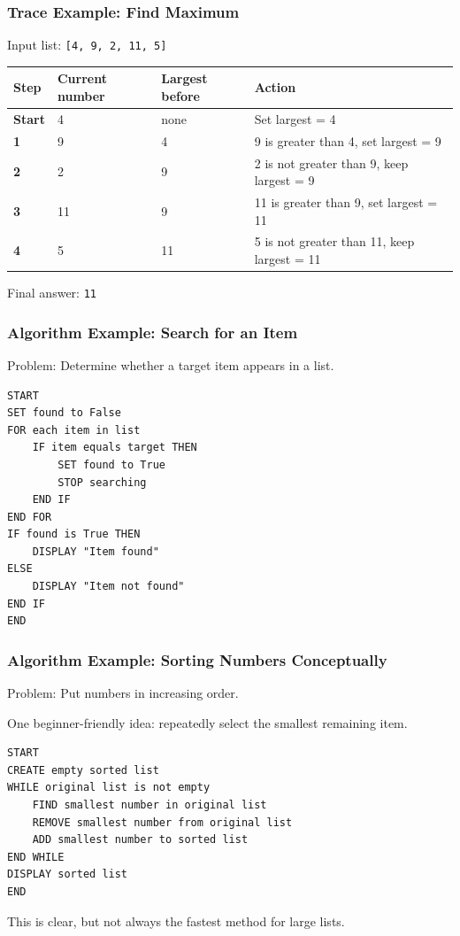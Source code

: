 \documentclass[aspectratio=169,10pt]{beamer}
\begin{document}
\begin{frame}
\frametitle{Trace Example: Find Maximum}
\vspace{0.72cm}
Input list: \texttt{[4, 9, 2, 11, 5]}
\vspace{0.05cm}
\renewcommand{\arraystretch}{1.1}
\begin{tabularx}{\textwidth}{>{\bfseries}p{1.75cm}p{2.25cm}p{2.55cm}X}
\toprule
Step & Current number & Largest before & Action \\
\midrule
Start & 4 & none & Set largest = 4 \\
1 & 9 & 4 & 9 is greater than 4, set largest = 9 \\
2 & 2 & 9 & 2 is not greater than 9, keep largest = 9 \\
3 & 11 & 9 & 11 is greater than 9, set largest = 11 \\
4 & 5 & 11 & 5 is not greater than 11, keep largest = 11 \\
\bottomrule
\end{tabularx}
\vspace{0.28cm}
Final answer: \texttt{11}
\end{frame}


\begin{frame}[fragile]
\frametitle{Algorithm Example: Search for an Item}
\vspace{0.08cm}
Problem: Determine whether a target item appears in a list.
\vspace{0.08cm}
\begin{lstlisting}[style=pseudo,basicstyle=\ttfamily\normalsize]
START
SET found to False
FOR each item in list
    IF item equals target THEN
        SET found to True
        STOP searching
    END IF
END FOR
IF found is True THEN
    DISPLAY "Item found"
ELSE
    DISPLAY "Item not found"
END IF
END
\end{lstlisting}
\end{frame}


\begin{frame}[fragile]
\frametitle{Algorithm Example: Sorting Numbers Conceptually}
\vspace{0.38cm}
Problem: Put numbers in increasing order.\par
One beginner-friendly idea: repeatedly select the smallest remaining item.
\vspace{0.08cm}
\begin{lstlisting}[style=pseudo,basicstyle=\ttfamily\normalsize]
START
CREATE empty sorted list
WHILE original list is not empty
    FIND smallest number in original list
    REMOVE smallest number from original list
    ADD smallest number to sorted list
END WHILE
DISPLAY sorted list
END
\end{lstlisting}
\vspace{0.10cm}
This is clear, but not always the fastest method for large lists.
\end{frame}
\end{document}
